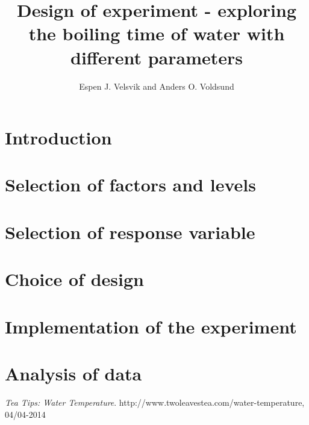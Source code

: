\documentclass[10pt,a4paper]{article}
\begin{document}
\title{Design of experiment - exploring the boiling time of water with different parameters}
\author{Espen J. Velsvik and Anders O. Voldsund}
\maketitle

\section{Introduction}


\section{Selection of factors and levels}


\section{Selection of response variable}


\section{Choice of design}


\section{Implementation of the experiment}


\section{Analysis of data}




\begin{thebibliography}{9}
  \emph{Tea Tips: Water Temperature}.
  http://www.twoleavestea.com/water-temperature, 04/04-2014

\end{thebibliography}
\end{document}

